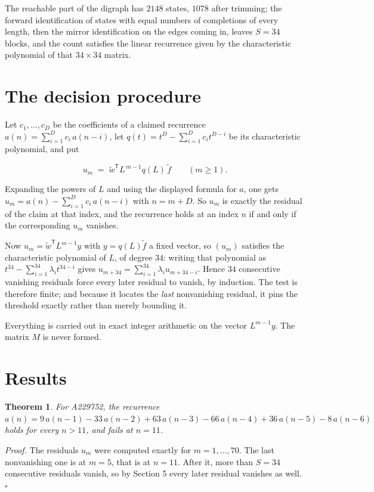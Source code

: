 \documentclass[11pt]{article}
\newtheorem{theorem}{Theorem}
\theoremstyle{definition}
\begin{document}
The reachable part of the digraph has $2148$ states, $1078$ after trimming; the forward identification of states with equal numbers of completions of every length, then the mirror identification on the edges coming in, leaves $S = 34$ blocks, and the count satisfies the linear recurrence given by the characteristic polynomial of that $34\times34$ matrix.

\section{The decision procedure}

Let $c_1,\dots,c_D$ be the coefficients of a claimed recurrence $a(n) = \sum_{i=1}^{D} c_i\,a(n-i)$, let $q(t) = t^{D} - \sum_{i=1}^{D} c_i t^{D-i}$ be its characteristic polynomial, and put

\[u_m \;=\; \tilde w^{\mathsf T} L^{\,m-1} q(L)\,\tilde f \qquad (m \ge 1).\]

Expanding the powers of $L$ and using the displayed formula for $a$, one gets $u_m = a(n) - \sum_{i=1}^{D} c_i\,a(n-i)$ with $n = m + D$. So $u_m$ is exactly the residual of the claim at that index, and the recurrence holds at an index $n$ if and only if the corresponding $u_m$ vanishes.

Now $u_m = \tilde w^{\mathsf T} L^{m-1} y$ with $y = q(L)\tilde f$ a fixed vector, so $(u_m)$ satisfies the characteristic polynomial of $L$, of degree $34$: writing that polynomial as $t^{34} - \sum_{i=1}^{34} \lambda_i t^{34-i}$ gives $u_{m+34} = \sum_{i=1}^{34} \lambda_i u_{m+34-i}$. Hence $34$ consecutive vanishing residuals force every later residual to vanish, by induction. The test is therefore finite; and because it locates the {\itshape last} nonvanishing residual, it pins the threshold exactly rather than merely bounding it.

Everything is carried out in exact integer arithmetic on the vector $L^{m-1}y$. The matrix $M$ is never formed.

\section{Results}

\begin{theorem} For A229752, the recurrence $a(n) = 9\,a(n-1) - 33\,a(n-2) + 63\,a(n-3) - 66\,a(n-4) + 36\,a(n-5) - 8\,a(n-6)$ holds for every $n > 11$, and fails at $n = 11$.\end{theorem}

{\itshape Proof.} The residuals $u_m$ were computed exactly for $m = 1,\dots,70$. The last nonvanishing one is at $m = 5$, that is at $n = 11$. After it, more than $S = 34$ consecutive residuals vanish, so by Section 5 every later residual vanishes as well. $\square$
\end{document}

